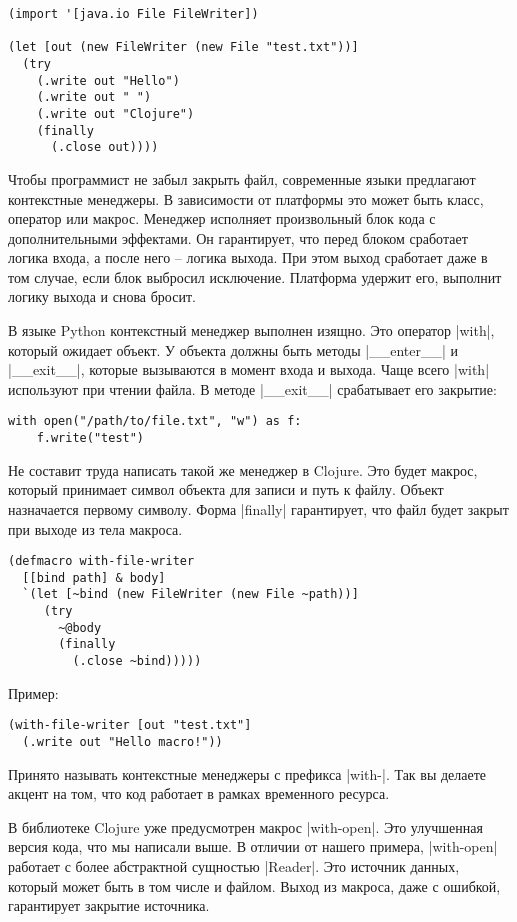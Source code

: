\begin{verbatim}
(import '[java.io File FileWriter])

(let [out (new FileWriter (new File "test.txt"))]
  (try
    (.write out "Hello")
    (.write out " ")
    (.write out "Clojure")
    (finally
      (.close out))))
\end{verbatim}

Чтобы программист не забыл закрыть файл, современные языки предлагают
контекстные менеджеры. В зависимости от платформы это может быть класс, оператор
или макрос. Менеджер исполняет произвольный блок кода с дополнительными
эффектами. Он гарантирует, что перед блоком сработает логика входа, а после него
-- логика выхода. При этом выход сработает даже в том случае, если блок выбросил
исключение. Платформа удержит его, выполнит логику выхода и снова бросит.

В языке Python контекстный менеджер выполнен изящно. Это оператор \spverb|with|,
который ожидает объект. У объекта должны быть методы \spverb|__enter__| и \spverb|__exit__|,
которые вызываются в момент входа и выхода. Чаще всего \spverb|with| используют при
чтении файла. В методе \spverb|__exit__| срабатывает его закрытие:

\begin{verbatim}
with open("/path/to/file.txt", "w") as f:
    f.write("test")
\end{verbatim}

Не составит труда написать такой же менеджер в Clojure. Это будет макрос,
который принимает символ объекта для записи и путь к файлу. Объект назначается
первому символу. Форма \spverb|finally| гарантирует, что файл будет закрыт при выходе
из тела макроса.

\begin{verbatim}
(defmacro with-file-writer
  [[bind path] & body]
  `(let [~bind (new FileWriter (new File ~path))]
     (try
       ~@body
       (finally
         (.close ~bind)))))
\end{verbatim}

Пример:

\begin{verbatim}
(with-file-writer [out "test.txt"]
  (.write out "Hello macro!"))
\end{verbatim}

Принято называть контекстные менеджеры с префикса \spverb|with-|. Так вы делаете акцент
на том, что код работает в рамках временного ресурса.

В библиотеке Clojure уже предусмотрен макрос \spverb|with-open|. Это улучшенная версия
кода, что мы написали выше. В отличии от нашего примера, \spverb|with-open| работает с
более абстрактной сущностью \spverb|Reader|. Это источник данных, который может быть в
том числе и файлом. Выход из макроса, даже с ошибкой, гарантирует закрытие
источника.

